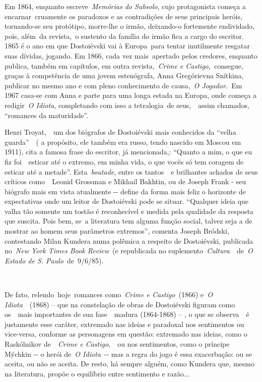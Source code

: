 Em 1864, enquanto escreve~\emph{Memórias do Subsolo}, cujo protagonista
começa a encarnar~cruamente os paradoxos e as contradições de seus
principais heróis, tornando-se seu protótipo, morre-lhe o irmão,
deixando-o fortemente endividado, pois, além~da revista,~o sustento da
família do irmão fica a cargo do escritor. 1865 é o ano em que
Dostoiévski vai à Europa~para tentar inutilmente resgatar suas dívidas,
jogando. Em 1866, cada vez mais~apertado pelos credores, enquanto
publica, também em capítulos, em outra revista,~\emph{Crime e
Castigo,}~consegue, graças à competência de uma jovem estenógrafa, Anna
Gregórievna Snítkina, publicar no mesmo ano e com pleno conhecimento de
causa,~\emph{O Jogador.~}Em 1967 casa-se com Anna e parte para uma longa
estada na Europa, onde começa a redigir~\emph{O Idiota}, completando com
isso a tetralogia~de seus,~~assim chamados, ``romances da maturidade''.

Henri Troyat,~~um dos biógrafos de Dostoiévski mais conhecidos da
``velha guarda''~~( a propósito, ele também era russo, tendo nascido em
Moscou em 1911), cita a famosa frase do escritor, já mencionada,:
``Quanto a mim, o que eu fiz foi~~esticar até o extremo, em minha vida,
o que vocês só tem coragem de esticar até a metade''.
Esta~\emph{boutade}, entre os tantos~~e brilhantes achados de seus
críticos como~~Leonid Grossman e Mikhail Bakhtin, ou de Joseph Frank -
seu biógrafo mais em vista atualmente -\/- define da forma mais feliz o
horizonte de expectativas onde um leitor de Dostoiévski pode se situar.
``Qualquer ideia que valha tão somente um tostão é reconhecível e medida
pela qualidade da resposta que suscita. Pois bem, se~a literatura tem
alguma função social, talvez seja a de mostrar ao homem seus parâmetros
extremos'', comenta Joseph Bródski, contestando Milan Kundera numa
polêmica a respeito de Dostoiévski, publicada no~\emph{New York Times
Book Review}~(e republicada no suplemento~\emph{Cultura~}~de~\emph{O
Estado de S. Paulo}~de~9/6/85).

~

De fato, relendo~hoje~romances como~\emph{Crime e Castigo~}(1866)
e~\emph{O Idiota}~~(1868) -- que na constelação de obras de Dostoiévski
figuram como os~~mais importantes de sua fase~~madura (1864-1868) -- , o
que se observa~~é justamente esse caráter, extremado nas ideias e
paradoxal nos sentimentos ou vice-versa, conforme as personagens em
questão: extremado nas ideias, como o Raskólnikov de~~\emph{Crime e
Castigo},~\emph{~}ou nos sentimentos, como o príncipe Mýchkin -\/- o
herói de~\emph{O Idiota}~-\/- mas a regra do jogo é essa exacerbação: ou
se aceita, ou não se aceita. De resto, há sempre alguém, como Kundera
que, mesmo na literatura, propõe o equilíbrio entre sentimento e
razão...

